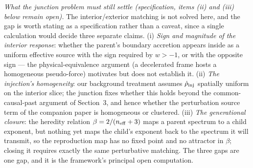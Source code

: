 \documentclass[11pt]{article}
\begin{document}
\emph{What the junction problem must still settle (specification, items (ii) and (iii) below remain open).} The interior/exterior matching is not solved here, and the gap is worth stating
as a specification rather than a caveat, since a single calculation would decide three separate
claims. (i) \emph{Sign and magnitude of the interior response}: whether the parent's boundary
accretion appears inside as a uniform effective source with the sign required by $w > -1$, or with
the opposite sign --- the physical-equivalence argument (a decelerated frame hosts a homogeneous
pseudo-force) motivates but does not establish it. (ii) \emph{The injection's homogeneity}: our
background treatment assumes $\dot\rho_{\rm inj}$ spatially uniform on the interior slice; the
junction fixes whether this holds beyond the common-causal-past argument of Section~3, and hence
whether the perturbation source term of the companion paper is homogeneous or clustered.
(iii) \emph{The generational closure}: the heredity relation $\beta = 2/(n_{\rm eff}+3)$ maps a
parent spectrum to a child exponent, but nothing yet maps the child's exponent back to the spectrum
it will transmit, so the reproduction map has no fixed point and no attractor in $\beta$; closing it
requires exactly the same perturbative matching. The three gaps are one gap, and it is the framework's
principal open computation.
\end{document}
